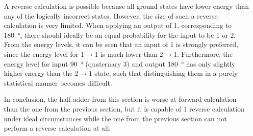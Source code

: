 \documentclass[11pt,a4paper,english,twoside]{article}
\begin{document}
A reverse calculation is possible because all ground states have lower energy than any of the logically incorrect states. However, the size of such a reverse calculation is very limited. When applying an output of 1, corresponding to \SI{180}{\degree}, there should ideally be an equal probability for the input to be 1 or 2. From the energy levels, it can be seen that an input of 1 is strongly preferred, since the energy level for $1\rightarrow1$ is much lower than $2\rightarrow1$. Furthermore, the energy level for input \SI{90}{\degree} (quaternary 3) and output \SI{180}{\degree} has only slightly higher energy than the $2\rightarrow1$ state, such that distinguishing them in a purely statistical manner becomes difficult. \par
In conclusion, the half adder from this section is worse at forward calculation than the one from the previous section, but it is capable of 1 reverse calculation under ideal circumstances while the one from the previous section can not perform a reverse calculation at all. \par
\end{document}
